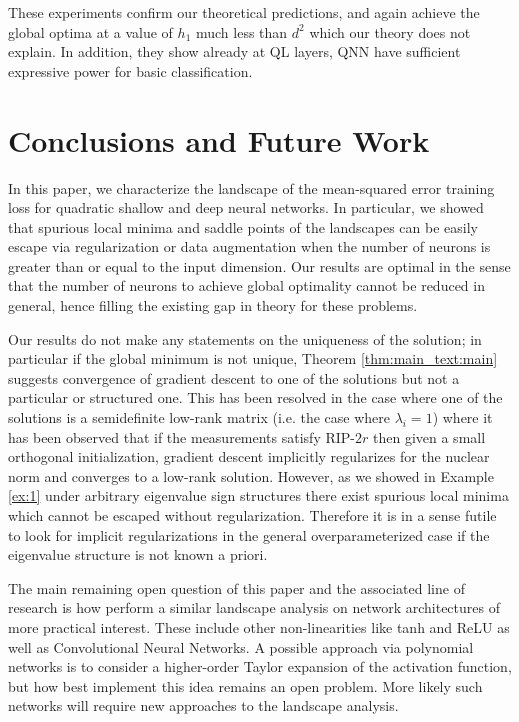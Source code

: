 \documentclass[11pt]{article}
\theoremstyle{plain}
\theoremstyle{plain}
\numberwithin{equation}{section}
\numberwithin{lemma}{section}
\numberwithin{theorem}{section}
\numberwithin{corollary}{section}
\numberwithin{observation}{section}
\numberwithin{definition}{section}
\numberwithin{example}{section}
\begin{document}
These experiments confirm our theoretical predictions, and again achieve the global optima at a value of $h_1$ much less than $d^2$ which our theory does not explain. In addition, they show already at QL layers, QNN have sufficient expressive power for basic classification.

 \section{Conclusions and Future Work}



In this paper, we characterize the landscape of the mean-squared error training loss for quadratic shallow and deep neural networks. In particular, we showed that spurious local minima and saddle points of the landscapes can be easily escape via regularization or data augmentation when the number of neurons is greater than or equal to the input dimension. Our results are optimal in the sense that the number of neurons to achieve global optimality cannot be reduced in general, hence filling the existing gap in theory for these problems.

Our results do not make any statements on the uniqueness of the solution; in particular if the global minimum is not unique, Theorem \ref{thm:main_text:main} suggests convergence of gradient descent to one of the solutions but not a particular or structured one. This has been resolved in the case where one of the solutions is a semidefinite low-rank matrix (i.e. the case where $\lambda_i = 1$) \cite{ge2017no, algReg18, bhojanapalli2016global} where it has been observed that if the measurements satisfy RIP-$2r$ then given a small orthogonal initialization, gradient descent implicitly regularizes for the nuclear norm and converges to a low-rank solution. However, as we showed in Example \ref{ex:1} under arbitrary eigenvalue sign structures there exist spurious local minima which cannot be escaped without regularization. Therefore it is in a sense futile to look for implicit regularizations in the general overparameterized case if the eigenvalue structure is not known a priori.

The main remaining open question of this paper and the associated line of research is how perform a similar landscape analysis on network architectures of more practical interest. These include other non-linearities like tanh and ReLU as well as Convolutional Neural Networks.  A possible approach via polynomial networks is to consider a higher-order Taylor expansion of the activation function, but how best implement this idea remains an open problem.  More likely such networks will require new approaches to the landscape analysis.
\end{document}
